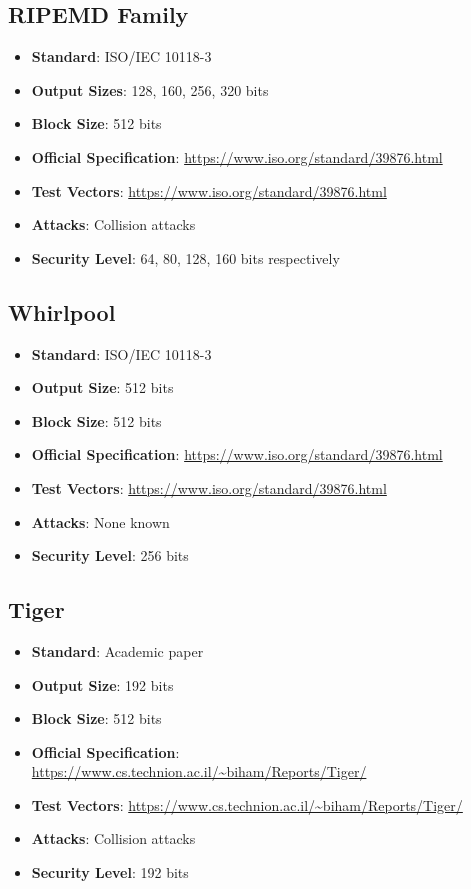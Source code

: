 \documentclass[11pt,a4paper]{article}
\begin{document}
\subsection{RIPEMD Family}
\begin{itemize}
    \item \textbf{Standard}: ISO/IEC 10118-3
    \item \textbf{Output Sizes}: 128, 160, 256, 320 bits
    \item \textbf{Block Size}: 512 bits
    \item \textbf{Official Specification}: \url{https://www.iso.org/standard/39876.html}
    \item \textbf{Test Vectors}: \url{https://www.iso.org/standard/39876.html}
    \item \textbf{Attacks}: Collision attacks
    \item \textbf{Security Level}: 64, 80, 128, 160 bits respectively
\end{itemize}

\subsection{Whirlpool}
\begin{itemize}
    \item \textbf{Standard}: ISO/IEC 10118-3
    \item \textbf{Output Size}: 512 bits
    \item \textbf{Block Size}: 512 bits
    \item \textbf{Official Specification}: \url{https://www.iso.org/standard/39876.html}
    \item \textbf{Test Vectors}: \url{https://www.iso.org/standard/39876.html}
    \item \textbf{Attacks}: None known
    \item \textbf{Security Level}: 256 bits
\end{itemize}

\subsection{Tiger}
\begin{itemize}
    \item \textbf{Standard}: Academic paper
    \item \textbf{Output Size}: 192 bits
    \item \textbf{Block Size}: 512 bits
    \item \textbf{Official Specification}: \url{https://www.cs.technion.ac.il/~biham/Reports/Tiger/}
    \item \textbf{Test Vectors}: \url{https://www.cs.technion.ac.il/~biham/Reports/Tiger/}
    \item \textbf{Attacks}: Collision attacks
    \item \textbf{Security Level}: 192 bits
\end{itemize}
\end{document}

